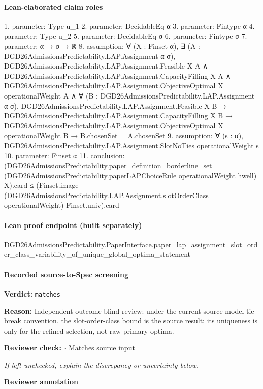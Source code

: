 \documentclass[10pt]{article}
\newcommand{\reviewerbox}{%
  \par\noindent\fbox{\parbox{0.96\linewidth}{\rule{0pt}{0.38in}}}\par
}
\newcommand{\reviewmatch}[1]{%
  \par\noindent\textbf{Reviewer check:} $\square$\; #1\par
  \noindent\emph{If left unchecked, explain the discrepancy or uncertainty below.}\par
}
\begin{document}
\paragraph{Lean-elaborated claim roles}\begin{ReviewVerbatim}
1. parameter: Type u_1
2. parameter: DecidableEq α
3. parameter: Fintype α
4. parameter: Type u_2
5. parameter: DecidableEq σ
6. parameter: Fintype σ
7. parameter: α → σ → ℝ
8. assumption: ∀ (X : Finset α),
  ∃ (A : DGD26AdmissionsPredictability.LAP.Assignment α σ),
    DGD26AdmissionsPredictability.LAP.Assignment.Feasible X A ∧
      DGD26AdmissionsPredictability.LAP.Assignment.CapacityFilling X A ∧
        DGD26AdmissionsPredictability.LAP.Assignment.ObjectiveOptimal X operationalWeight A ∧
          ∀ (B : DGD26AdmissionsPredictability.LAP.Assignment α σ),
            DGD26AdmissionsPredictability.LAP.Assignment.Feasible X B →
              DGD26AdmissionsPredictability.LAP.Assignment.CapacityFilling X B →
                DGD26AdmissionsPredictability.LAP.Assignment.ObjectiveOptimal X operationalWeight B →
                  B.chosenSet = A.chosenSet
9. assumption: ∀ (s : σ), DGD26AdmissionsPredictability.LAP.Assignment.SlotNoTies operationalWeight s
10. parameter: Finset α
11. conclusion: (DGD26AdmissionsPredictability.paper_definition_borderline_set
      (DGD26AdmissionsPredictability.paperLAPChoiceRule operationalWeight hwell) X).card ≤
  (Finset.image (DGD26AdmissionsPredictability.LAP.Assignment.slotOrderClass operationalWeight) Finset.univ).card
\end{ReviewVerbatim}

\paragraph{Lean proof endpoint (built separately)}\begin{ReviewVerbatim}
DGD26AdmissionsPredictability.PaperInterface.paper_lap_assignment_slot_order_class_variability_of_unique_global_optima_statement
\end{ReviewVerbatim}

\paragraph{Recorded source-to-Spec screening}
\textbf{Verdict:} \texttt{matches}
\\
{\raggedright
\textbf{Reason:} Independent outcome-\allowbreak{}blind review:\allowbreak{} under the current source-\allowbreak{}model tie-\allowbreak{}break convention, the slot-\allowbreak{}order-\allowbreak{}class bound is the source result;\allowbreak{} its uniqueness is only for the refined selection, not raw-\allowbreak{}primary optima.\allowbreak{}
\par}
\reviewmatch{Matches source input}
\noindent\textbf{Reviewer annotation}\par
\reviewerbox
\clearpage
\hypertarget{source-claim-a9c5e5d5c616ab58}{}
\end{document}
